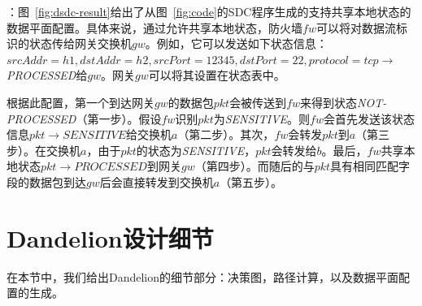 ：图~\ref{fig:dsdc-result}给出了从图~\ref{fig:code}的SDC程序生成的支持共享本地状态的数据平面配置。具体来说，通过允许共享本地状态，防火墙$fw$可以将对数据流标识的状态传给网关交换机$gw$。例如，它可以发送如下状态信息：$srcAddr=h1,dstAddr=h2,srcPort=12345,dstPort=22,protocol=tcp \rightarrow$
\emph{PROCESSED}给$gw$。网关$gw$可以将其设置在状态表中。


根据此配置，第一个到达网关$gw$的数据包$pkt$会被传送到$fw$来得到状态\emph{NOT-PROCESSED}（第一步）。假设$fw$识别$pkt$为\emph{SENSITIVE}。则$fw$会首先发送该状态信息$pkt \rightarrow SENSITIVE$给交换机$a$（第二步）。其次，$fw$会转发$pkt$到$a$（第三步）。在交换机$a$，由于$pkt$的状态为\emph{SENSITIVE}，$pkt$会转发给$b$。最后，$fw$共享本地状态$pkt \rightarrow PROCESSED$到网关$gw$（第四步）。而随后的与$pkt$具有相同匹配字段的数据包到达$gw$后会直接转发到交换机$a$（第五步）。



\section{Dandelion设计细节}

在本节中，我们给出Dandelion的细节部分：决策图，路径计算，以及数据平面配置的生成。


